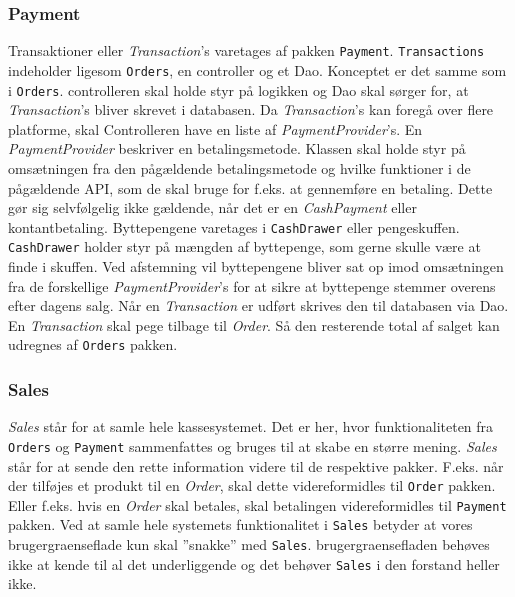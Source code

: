 \subsubsection{Payment}
Transaktioner eller \textit{Transaction}'s varetages af pakken \texttt{Payment}. \texttt{Transactions} indeholder ligesom \texttt{Orders}, en \Gls{controller} og et \Gls{Dao}. Konceptet er det samme som i \texttt{Orders}. \Gls{controller}en skal holde styr på logikken og \Gls{Dao} skal sørger for, at \textit{Transaction}'s bliver skrevet i databasen.
\newline\newline
Da \textit{Transaction}'s kan foregå over flere platforme, skal \gls{Controller}en have en liste af \textit{PaymentProvider}'s. En \textit{PaymentProvider}  beskriver en betalingsmetode. Klassen skal holde styr på omsætningen fra den pågældende betalingsmetode og hvilke funktioner i de pågældende \gls{API}, som de skal bruge for f.eks. at gennemføre en betaling. Dette gør sig selvfølgelig ikke gældende, når det er en \textit{CashPayment} eller kontantbetaling. Byttepengene varetages i \texttt{CashDrawer} eller pengeskuffen. \texttt{CashDrawer} holder styr på mængden af byttepenge, som gerne skulle være at finde i skuffen. Ved afstemning vil byttepengene bliver sat op imod omsætningen fra de forskellige \textit{PaymentProvider}'s for at sikre at byttepenge stemmer overens efter dagens salg.
\newline\newline
Når en \textit{Transaction} er udført skrives den til databasen via \gls{Dao}. En \textit{Transaction} skal pege tilbage til \textit{Order}. Så den resterende total af salget kan udregnes af \texttt{Orders} pakken.

\subsubsection{Sales}
\textit{Sales} står for at samle hele kassesystemet. Det er her, hvor funktionaliteten fra \texttt{Orders} og \texttt{Payment} sammenfattes og bruges til at skabe en større mening. \textit{Sales} står for at sende den rette information videre til de respektive pakker. F.eks. når der tilføjes et produkt til en \textit{Order}, skal dette videreformidles til \texttt{Order} pakken. Eller f.eks. hvis en \textit{Order} skal betales, skal betalingen videreformidles til \texttt{Payment} pakken.
\newline\newline
Ved at samle hele systemets funktionalitet i \texttt{Sales} betyder at vores \gls{brugergraenseflade} kun skal ''snakke'' med \texttt{Sales}. \Gls{brugergraenseflade}n behøves ikke at kende til al det underliggende og det behøver \texttt{Sales} i den forstand heller ikke.